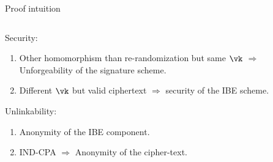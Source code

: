 \begin{frame}{Proof intuition}
  
  \begin{columns}
    
    \begin{column}{0.5\textwidth}
      Security:
      \begin{enumerate}
      \item \alert<+>{Other homomorphism than re-randomization but same $\vk$ $\Rightarrow$ Unforgeability of the signature scheme.}
      \item \alert<+>{Different $\vk$ but valid ciphertext $\Rightarrow$ security of the IBE scheme.}
      \end{enumerate}

      \pause
      
      Unlinkability:
      \begin{enumerate}
      \item \alert<+>{Anonymity of the IBE component.}
      \item \alert<+>{IND-CPA $\Rightarrow$ Anonymity of the cipher-text.}
      \end{enumerate}
    \end{column}
  \end{columns}
  
\end{frame}

